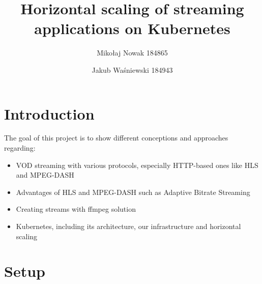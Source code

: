 \documentclass{article}
\title{Horizontal scaling of streaming applications on Kubernetes}
\author{Mikołaj Nowak 184865 \and Jakub Waśniewski 184943}
\date{}
\begin{document}
\maketitle

\section{Introduction}

The goal of this project is to show different conceptions and approaches regarding:
\begin{itemize}
  \item VOD streaming with various protocols, especially HTTP-based ones like HLS and MPEG-DASH
  \item Advantages of HLS and MPEG-DASH such as Adaptive Bitrate Streaming
  \item Creating streams with ffmpeg solution
  \item Kubernetes, including its architecture, our infrastructure and horizontal scaling
\end{itemize}

\section{Setup}\label{setup}
\end{document}

